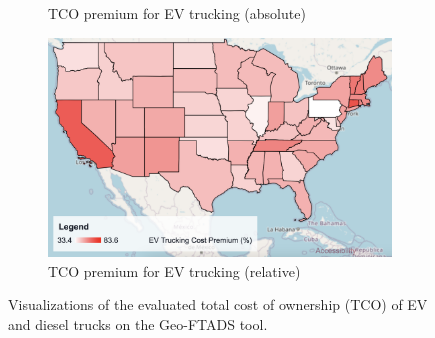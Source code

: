 \begin{figure}[H]
\begin{subfigure}[b]{0.49\textwidth}
        \caption{TCO premium for EV trucking (absolute)}
        \label{fig:ev_cost_premium_abs}
    \end{subfigure}
    \hfill
    \begin{subfigure}[b]{0.49\textwidth}
        \centering
        \includegraphics[width=\textwidth]{figures/ev_cost_premium_rel.png}
        \caption{TCO premium for EV trucking (relative)}
        \label{fig:ev_cost_premium_rel}
    \end{subfigure}
    \caption{Visualizations of the evaluated total cost of ownership (TCO) of EV and diesel trucks on the Geo-FTADS tool.}
    \label{fig:tco_maps}
\end{figure}